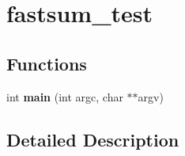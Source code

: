 \hypertarget{group__applications__fastsum__test}{\section{fastsum\-\_\-test}
\label{group__applications__fastsum__test}
}
\subsection*{Functions}
\begin{DoxyCompactItemize}
\item 
\hypertarget{group__applications__fastsum__test_ga3c04138a5bfe5d72780bb7e82a18e627}{int {\bfseries main} (int argc, char $\ast$$\ast$argv)}\label{group__applications__fastsum__test_ga3c04138a5bfe5d72780bb7e82a18e627}

\end{DoxyCompactItemize}


\subsection{Detailed Description}
